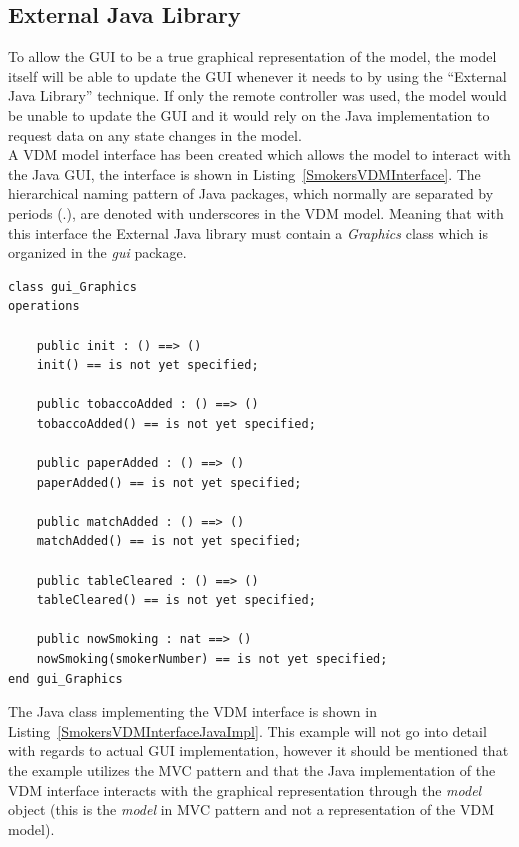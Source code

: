 \documentclass{overturerepchap}
\begin{document}
\subsection{External Java Library}
To allow the GUI to be a true graphical representation of the model, the model itself will be able to update the GUI whenever it needs to by using the ``External Java Library'' technique. If only the remote controller was used, the model would be unable to update the GUI and it would rely on the Java implementation to request data on any state changes in the model. \\

A VDM model interface has been created which allows the model to interact with the Java GUI, the interface is shown in Listing~\ref{SmokersVDMInterface}. The hierarchical naming pattern of Java packages, which  normally are separated by periods (.), are denoted with underscores in the VDM model. Meaning that with this interface the External Java library must contain a  \textit{Graphics} class which is organized in the \textit{gui} package.  

\begin{lstlisting}[language=VDM++,label=SmokersVDMInterface,caption=VDM interface for external Java library,captionpos=b]
class gui_Graphics
operations

    public init : () ==> ()
	init() == is not yet specified;

	public tobaccoAdded : () ==> ()
	tobaccoAdded() == is not yet specified; 

	public paperAdded : () ==> ()
	paperAdded() == is not yet specified; 

	public matchAdded : () ==> ()
	matchAdded() == is not yet specified; 

	public tableCleared : () ==> ()
	tableCleared() == is not yet specified;  

	public nowSmoking : nat ==> ()
	nowSmoking(smokerNumber) == is not yet specified;
end gui_Graphics
\end{lstlisting}

The Java class implementing the VDM interface is shown in Listing~\ref{SmokersVDMInterfaceJavaImpl}. This example will not go into detail with regards to actual GUI implementation, however it should be mentioned that the example utilizes the MVC pattern and that the Java implementation of the VDM interface interacts with the graphical representation through the \textit{model} object (this is the \textit{model} in MVC pattern and not a representation of the VDM model).  
\end{document}
